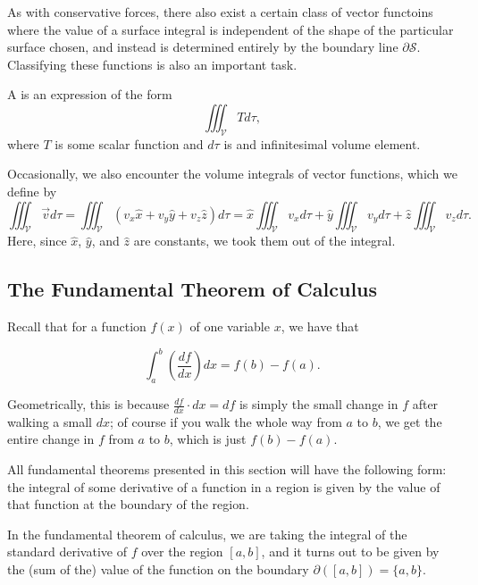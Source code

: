 As with conservative forces, there also exist a certain class of vector functoins where
the value of a surface integral is independent of the shape of the particular surface chosen,
and instead is determined entirely by the boundary line $\partial \mathcal{S}$. 
Classifying these functions is also an important task.

\begin{definition}\label{defvolint}
    A  is an expression of the form
    \[\iiint_{\mathcal{V}}Td\tau,\]
    where $T$ is some scalar function and $d\tau$ is and infinitesimal volume element.
\end{definition}

Occasionally, we also encounter the volume integrals of vector functions, which we define by
\[\iiint_{\mathcal{V}}\vec{v}d\tau=\iiint_{\mathcal{V}}(v_x\hat{x}+v_y\hat{y}+v_z\hat{z})d\tau=\hat{x}\iiint_{\mathcal{V}} v_xd\tau+\hat{y}\iiint_{\mathcal{V}} v_yd\tau+\hat{z}\iiint_{\mathcal{V}} v_zd\tau.\]
Here, since $\hat{x}$, $\hat{y}$, and $\hat{z}$ are constants, we took them out of the integral.

\subsection{The Fundamental Theorem of Calculus}

Recall that for a function $f(x)$ of one variable $x$, we have that

\begin{theorem}
\[\int_a^b\left(\frac{df}{dx}\right)dx=f(b)-f(a).\]
\end{theorem}

Geometrically, this is because $\frac{df}{dx}\cdot dx=df$ is simply the small change in $f$ after walking a small $dx$; of course if you walk the whole way from $a$ to $b$, we get the entire change in $f$ from $a$ to $b$, which is just $f(b)-f(a)$.

\begin{moral}
All fundamental theorems presented in this section will have the following form: the integral of some derivative of a function in a region is given by the value of that function at the boundary of the region.
\end{moral}

In the fundamental theorem of calculus, we are taking the integral of the standard derivative of $f$ over the region $[a,b]$, and it turns out to be given by the (sum of the) value of the function on the boundary $\partial([a,b])=\{a,b\}$.

